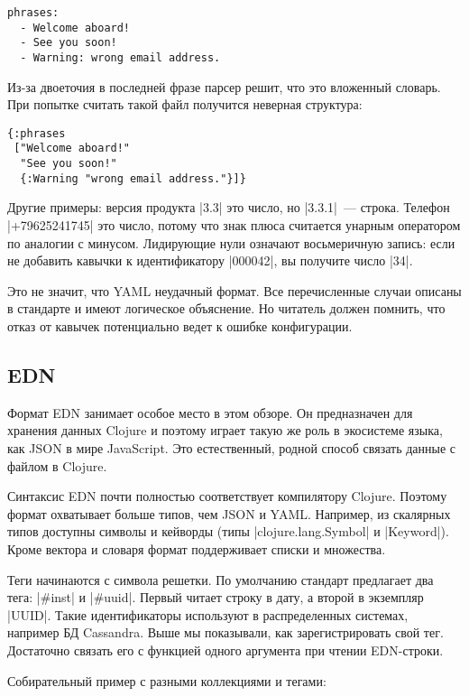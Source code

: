 \begin{verbatim}
phrases:
  - Welcome aboard!
  - See you soon!
  - Warning: wrong email address.
\end{verbatim}

Из-за двоеточия в последней фразе парсер решит, что это вложенный словарь. При
попытке считать такой файл получится неверная структура:

\begin{verbatim}
{:phrases
 ["Welcome aboard!"
  "See you soon!"
  {:Warning "wrong email address."}]}
\end{verbatim}

Другие примеры: версия продукта \spverb|3.3| это число, но \spverb|3.3.1|~--- строка. Телефон
\spverb|+79625241745| это число, потому что знак плюса считается унарным оператором по
аналогии с минусом. Лидирующие нули означают восьмеричную запись: если не
добавить кавычки к идентификатору \spverb|000042|, вы получите число \spverb|34|.

Это не значит, что YAML неудачный формат. Все перечисленные случаи описаны в
стандарте и имеют логическое объяснение. Но читатель должен помнить, что отказ
от кавычек потенциально ведет к ошибке конфигурации.

\subsection{EDN}

Формат EDN занимает особое место в этом обзоре. Он предназначен для хранения
данных Clojure и поэтому играет такую же роль в экосистеме языка, как JSON в
мире JavaScript. Это естественный, родной способ связать данные с файлом в
Clojure.

Синтаксис EDN почти полностью соответствует компилятору Clojure. Поэтому формат
охватывает больше типов, чем JSON и YAML. Например, из скалярных типов доступны
символы и кейворды (типы \spverb|clojure.lang.Symbol| и \spverb|Keyword|). Кроме вектора и
словаря формат поддерживает списки и множества.

Теги начинаются с символа решетки. По умолчанию стандарт предлагает два тега:
\spverb|#inst| и \spverb|#uuid|. Первый читает строку в дату, а второй в экземпляр
\spverb|UUID|. Такие идентификаторы используют в распределенных системах, например БД
Cassandra. Выше мы показывали, как зарегистрировать свой тег. Достаточно связать
его с функцией одного аргумента при чтении EDN-строки.

Собирательный пример с разными коллекциями и тегами:

